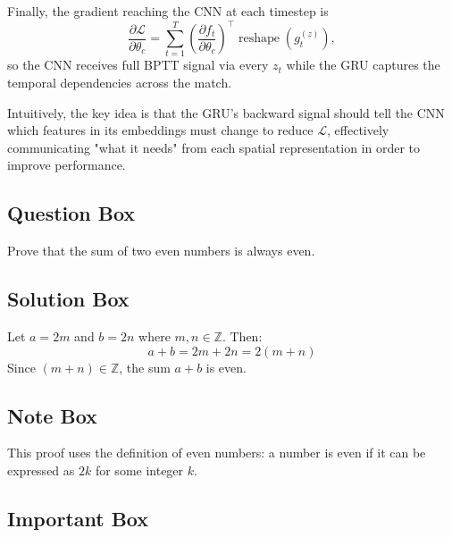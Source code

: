 \documentclass[tikz,12pt,a4paper]{article}
\theoremstyle{definition}
\begin{document}
  Finally, the gradient reaching the CNN at each timestep is
  \begin{equation}
      \frac{\partial \mathcal{L}}{\partial \theta_c}
      = \sum_{t=1}^{T}
          \left( \frac{\partial f_t}{\partial \theta_c} \right)^{\!\top}
          \operatorname{reshape}\!\left( g_t^{(z)} \right),
  \end{equation}
  so the CNN receives full BPTT signal via every $z_t$ while the GRU captures the temporal dependencies across the match.
  \begin{notebox}
  Intuitively, the key idea is that the GRU’s backward signal should tell the CNN which features in its embeddings must change to reduce $\mathcal{L}$, effectively communicating "what it needs" from each spatial representation in order to improve performance.
  \end{notebox}
  

\subsection{Question Box}

\begin{questionbox}
Prove that the sum of two even numbers is always even.
\end{questionbox}

\subsection{Solution Box}

\begin{solutionbox}
Let $a = 2m$ and $b = 2n$ where $m, n \in \mathbb{Z}$. Then:
\begin{equation}
a + b = 2m + 2n = 2(m + n)
\end{equation}
Since $(m + n) \in \mathbb{Z}$, the sum $a + b$ is even.
\end{solutionbox}

\subsection{Note Box}

\begin{notebox}
This proof uses the definition of even numbers: a number is even if it can be expressed as $2k$ for some integer $k$.
\end{notebox}

\subsection{Important Box}
\end{document}
